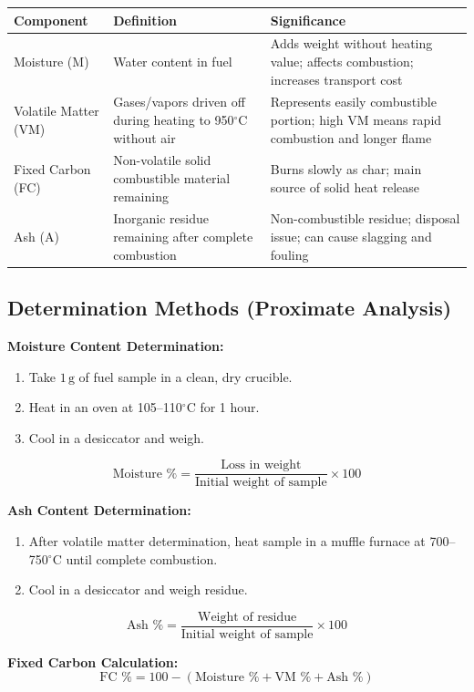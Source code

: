 \documentclass[12pt,a4paper]{article}
\begin{document}
\begin{center}
\renewcommand{\arraystretch}{1.4}
\begin{tabular}{|p{3.5cm}|p{5cm}|p{6cm}|}
\hline
\textbf{Component} & \textbf{Definition} & \textbf{Significance} \\
\hline
Moisture (M) & Water content in fuel & Adds weight without heating value; affects combustion; increases transport cost \\
\hline
Volatile Matter (VM) & Gases/vapors driven off during heating to 950$^\circ$C without air & Represents easily combustible portion; high VM means rapid combustion and longer flame \\
\hline
Fixed Carbon (FC) & Non-volatile solid combustible material remaining & Burns slowly as char; main source of solid heat release \\
\hline
Ash (A) & Inorganic residue remaining after complete combustion & Non-combustible residue; disposal issue; can cause slagging and fouling \\
\hline
\end{tabular}
\end{center}

\subsection{Determination Methods (Proximate Analysis)}

\textbf{Moisture Content Determination:}
\begin{enumerate}
    \item Take $1\,\text{g}$ of fuel sample in a clean, dry crucible.
    \item Heat in an oven at 105--110$^\circ$C for 1 hour.
    \item Cool in a desiccator and weigh.
\end{enumerate}
\[ \text{Moisture \%} = \frac{\text{Loss in weight}}{\text{Initial weight of sample}} \times 100 \]

\textbf{Ash Content Determination:}
\begin{enumerate}
    \item After volatile matter determination, heat sample in a muffle furnace at 700--750$^\circ$C until complete combustion.
    \item Cool in a desiccator and weigh residue.
\end{enumerate}
\[ \text{Ash \%} = \frac{\text{Weight of residue}}{\text{Initial weight of sample}} \times 100 \]

\textbf{Fixed Carbon Calculation:}
\[ \text{FC \%} = 100 - (\text{Moisture \%} + \text{VM \%} + \text{Ash \%}) \]
\end{document}
